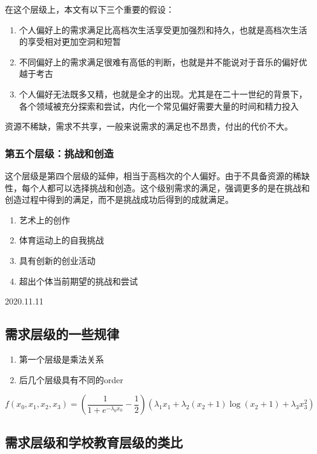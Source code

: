 在这个层级上，本文有以下三个重要的假设：

\begin{enumerate}
    \item 个人偏好上的需求满足比高档次生活享受更加强烈和持久，也就是高档次生活的享受相对更加空洞和短暂
    \item 不同偏好上的需求满足很难有高低的判断，也就是并不能说对于音乐的偏好优越于考古
    \item 个人偏好无法既多又精，也就是全才的出现。尤其是在二十一世纪的背景下，各个领域被充分探索和尝试，内化一个常见偏好需要大量的时间和精力投入
\end{enumerate}

资源不稀缺，需求不共享，一般来说需求的满足也不昂贵，付出的代价不大。

\subsubsection*{第五个层级：挑战和创造}

这个层级是第四个层级的延伸，相当于高档次的个人偏好。由于不具备资源的稀缺性，每个人都可以选择挑战和创造。这个级别需求的满足，强调更多的是在挑战和创造过程中得到的满足，而不是挑战成功后得到的成就满足。

\begin{enumerate}
    \item 艺术上的创作
    \item 体育运动上的自我挑战
    \item 具有创新的创业活动
    \item 超出个体当前期望的挑战和尝试
\end{enumerate}

2020.11.11

\subsection{需求层级的一些规律}

\begin{enumerate}
    \item 第一个层级是乘法关系
    \item 后几个层级具有不同的order
\end{enumerate}

$$f(x_0, x_1, x_2, x_3) = \left(\frac{1}{1 + e^{-\lambda_0 x_0}} - \frac{1}{2}\right) \left( \lambda_1 x_1 + \lambda_2(x_2 + 1)\log (x_2 +1) + \lambda_3 x_3^2 \right)$$

\subsection{需求层级和学校教育层级的类比}